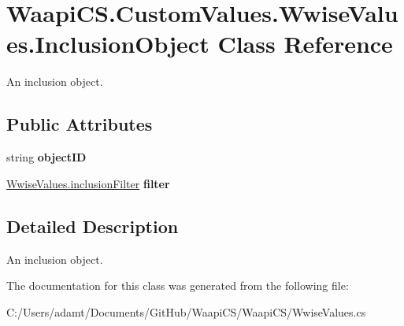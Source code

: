 \hypertarget{class_waapi_c_s_1_1_custom_values_1_1_wwise_values_1_1_inclusion_object}{}\section{Waapi\+C\+S.\+Custom\+Values.\+Wwise\+Values.\+Inclusion\+Object Class Reference}
\label{class_waapi_c_s_1_1_custom_values_1_1_wwise_values_1_1_inclusion_object}


An inclusion object.  


\subsection*{Public Attributes}
\begin{DoxyCompactItemize}
\item 
\mbox{\label{class_waapi_c_s_1_1_custom_values_1_1_wwise_values_1_1_inclusion_object_ae7935f7144eeb8bd1bce207292453104}} 
string {\bfseries object\+ID}
\item 
\mbox{\label{class_waapi_c_s_1_1_custom_values_1_1_wwise_values_1_1_inclusion_object_acd19b93d2d468cc3255bf57a24086f5b}} 
\mbox{\hyperlink{class_waapi_c_s_1_1_custom_values_1_1_wwise_values_a485191067ed69983f435631f759b6c93}{Wwise\+Values.\+inclusion\+Filter}} {\bfseries filter}
\end{DoxyCompactItemize}


\subsection{Detailed Description}
An inclusion object. 



The documentation for this class was generated from the following file\+:\begin{DoxyCompactItemize}
\item 
C\+:/\+Users/adamt/\+Documents/\+Git\+Hub/\+Waapi\+C\+S/\+Waapi\+C\+S/Wwise\+Values.\+cs\end{DoxyCompactItemize}
